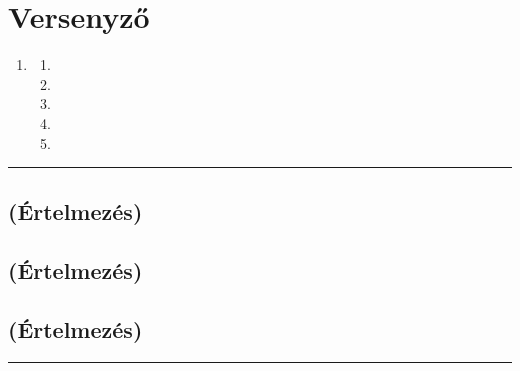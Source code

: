 \documentclass[]{report}
\newenvironment{expl}[0]%
  {\rule{\textwidth}{.2pt}\footnotesize}%
  {\rule{\textwidth}{.2pt}\normalsize}
\begin{document}
\chapter{Versenyző}

\begin{enumerate}
\item


  \begin{enumerate}
  \item
  
  \item
  
  \item
  
  \item
  
  \item
  
  \end{enumerate}
\end{enumerate}

\begin{expl}
\section*{(Értelmezés)}


\section*{(Értelmezés)}


\section*{(Értelmezés)}

\end{expl}
\end{document}
